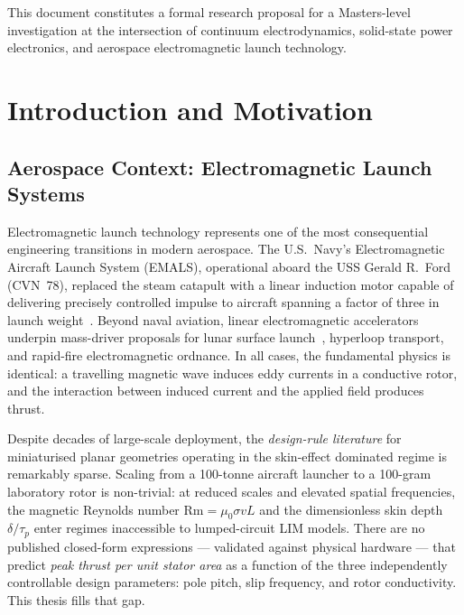 \documentclass[12pt,letterpaper]{article}
\begin{document}
\begin{titlepage}
\begin{center}
\vfill

{\small\color{darkgray}
This document constitutes a formal research proposal for a Masters-level investigation
at the intersection of continuum electrodynamics, solid-state power electronics,
and aerospace electromagnetic launch technology.}

\end{center}
\end{titlepage}

\tableofcontents
\newpage

\section{Introduction and Motivation}

\subsection{Aerospace Context: Electromagnetic Launch Systems}

Electromagnetic launch technology represents one of the most consequential engineering
transitions in modern aerospace. The U.S.\ Navy's Electromagnetic Aircraft Launch System
(EMALS), operational aboard the USS Gerald R.\ Ford (CVN~78), replaced the steam
catapult with a linear induction motor capable of delivering precisely controlled
impulse to aircraft spanning a factor of three in launch weight~\cite{Doyle2010}. Beyond
naval aviation, linear electromagnetic accelerators underpin mass-driver proposals for
lunar surface launch~\cite{Kolm1980}, hyperloop transport, and rapid-fire electromagnetic
ordnance. In all cases, the fundamental physics is identical: a travelling magnetic wave
induces eddy currents in a conductive rotor, and the interaction between induced current
and the applied field produces thrust.

Despite decades of large-scale deployment, the \emph{design-rule literature} for
miniaturised planar geometries operating in the skin-effect dominated regime is
remarkably sparse. Scaling from a 100-tonne aircraft launcher to a 100-gram laboratory
rotor is non-trivial: at reduced scales and elevated spatial frequencies, the magnetic
Reynolds number $\mathrm{Rm} = \mu_0\sigma v L$ and the dimensionless skin depth
$\delta/\tau_p$ enter regimes inaccessible to lumped-circuit LIM models. There are
no published closed-form expressions — validated against physical hardware — that
predict \emph{peak thrust per unit stator area} as a function of the three independently
controllable design parameters: pole pitch, slip frequency, and rotor conductivity.
This thesis fills that gap.
\end{document}
